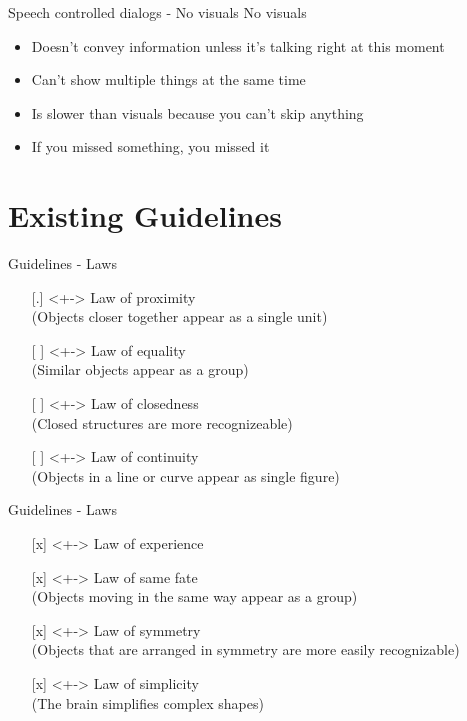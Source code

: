 \documentclass[
  10pt
, handout
]{beamer}
\begin{document}
\begin{frame}{Speech controlled dialogs - No visuals}
  No visuals

  \begin{itemize}
    \item Doesn't convey information unless it's talking right at this moment
    \item Can't show multiple things at the same time
    \item Is slower than visuals because you can't skip anything
    \item If you missed something, you missed it
  \end{itemize}
\end{frame}

\section{Existing Guidelines}

\begin{frame}{Guidelines - Laws}
  \begin{itemize}
    \item[{[.]}]<+-> Law of proximity \\ (Objects closer together appear as a single unit)
    \item[{[ ]}]<+-> Law of equality \\ (Similar objects appear as a group)
    \item[{[ ]}]<+-> Law of closedness \\ (Closed structures are more recognizeable)
    \item[{[ ]}]<+-> Law of continuity \\ (Objects in a line or curve appear as single figure)
  \end{itemize}
\end{frame}

\begin{frame}{Guidelines - Laws}
  \begin{itemize}
    \item[{[x]}]<+-> Law of experience
    \item[{[x]}]<+-> Law of same fate \\ (Objects moving in the same way appear as a group)
    \item[{[x]}]<+-> Law of symmetry \\ (Objects that are arranged in symmetry are more easily recognizable)
    \item[{[x]}]<+-> Law of simplicity \\ (The brain simplifies complex shapes)
  \end{itemize}
\end{frame}
\end{document}
